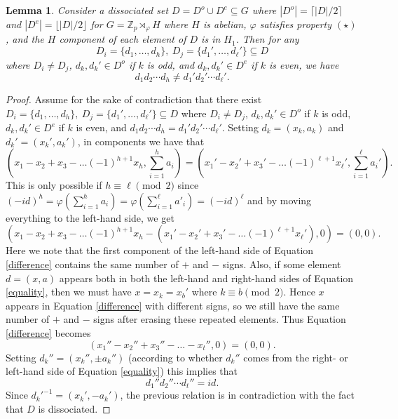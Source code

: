 \documentclass[11pt]{amsart}
\newtheorem{lemma}[theorem]{Lemma}
\theoremstyle{definition}
\begin{document}
\begin{lemma}\label{distinct-products}
Consider a dissociated set $D=D^o\cup D^e \subseteq G$ where $|D^o|=\lceil |D|/2 \rceil$ and $|D^e|=\lfloor |D|/2 \rfloor$ for $G=\mathbb{Z}_{p} \rtimes_{\varphi} H$ where $H$ is abelian, $\varphi$ satisfies property $(\star)$, and the $H$ component of each element of $D$ is in $H_1$. Then for any 
$$D_i=\{d_1,\dots,d_{h}\},\  D_j=\{d_1',\dots,d_{\ell}'\} \subseteq D$$
where $D_i \neq D_j$, $d_k,d_k'\in D^o$ if $k$ is odd, and $d_k,d_k'\in D^e$ if $k$ is even, we have 
$$d_1d_2\cdots d_h \neq d_1'd_2'\cdots d_{\ell}'.$$
\end{lemma}
\begin{proof}
Assume for the sake of contradiction that there exist $D_i=\{d_1,\dots,d_{h}\},\  D_j=\{d_1',\dots,d_{\ell}'\} \subseteq D$
where $D_i \neq D_j$, $d_k,d_k'\in D^o$ if $k$ is odd, $d_k,d_k'\in D^e$ if $k$ is even, and 
$d_1d_2\cdots d_h = d_1'd_2'\cdots d_{\ell}'.$
Setting $d_k=(x_k,a_k)$ and $d_k'=(x_k',a_k')$, in components we have that
\begin{equation}\label{equality}
(x_1-x_2+x_3-\dots (-1)^{h+1}x_h,\sum_{i=1}^h a_i) = (x_1'-x_2'+x_3'-\dots (-1)^{\ell+1}x_{\ell}',\sum_{i=1}^{\ell} a_i').\end{equation}
This is only possible if $h\equiv \ell \pmod{2}$ since $(-id)^h = \varphi(\sum_{i=1}^h a_i) =\varphi(\sum_{i=1}^{\ell} a'_i) = (-id)^{\ell}$ and by moving everything to the left-hand side, we get
\begin{equation}\label{difference}
(x_1-x_2+x_3-\dots (-1)^{h+1}x_h-(x_1'-x_2'+x_3'-\dots (-1)^{\ell+1}x_{\ell}'),0) = (0,0).
\end{equation}
Here we note that the first component of the left-hand side of Equation \eqref{difference} contains the same number of $+$ and $-$ signs. Also, if some element $d=(x,a)$ appears both in both the left-hand and right-hand sides of Equation \eqref{equality}, then we must have $x=x_k=x_{b}'$ where $k\equiv b \pmod{2}$. Hence $x$ appears in Equation \eqref{difference} with different signs, so we still have the same number of $+$ and $-$ signs after erasing these repeated elements. Thus Equation \eqref{difference} becomes
$$(x_1''-x_2''+x_3''-\dots -x_t'',0) = (0,0).$$
Setting $d_k''=(x_k'',\pm a_k'')$ (according to whether $d_k''$ comes from the right- or left-hand side of Equation \eqref{equality}) this implies that
$$d_1''d_2''\cdots d_t''=id.$$
Since $d_k'^{-1}=(x_k',-a_k')$, the previous relation is in contradiction with the fact that $D$ is dissociated.
\end{proof}
\end{document}
